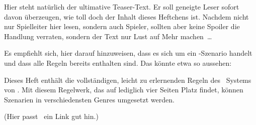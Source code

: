 
\thispagestyle{empty}

\spacerA
\begin{center}
\color{white}\parbox{110mm}{\bf\ffextra\large

Hier steht natürlich der ultimative Teaser-Text. Er soll geneigte Leser sofort davon überzeugen, wie toll doch der Inhalt dieses Heftchens ist. Nachdem nicht nur Spielleiter hier lesen, sondern auch Spieler, sollten aber keine Spoiler die Handlung verraten, sondern der Text nur Lust auf Mehr machen~\ldots

\vspace*{1em}

Es empfiehlt sich, hier darauf hinzuweisen, dass es sich um ein \nipajin-Szenario handelt und dass alle Regeln bereits enthalten sind. Das könnte etwa so aussehen:

\vspace*{1em}

Dieses Heft enthält die vollständigen, leicht zu erlernenden Regeln des \nipajin~Systems von \ludusleonis. Mit diesem Regelwerk, das auf lediglich vier Seiten Platz findet, können Szenarien in verschiedensten Genres umgesetzt werden. 
}

\vfill

{(Hier passt \zB~ein Link gut hin.)}

\vspace*{5mm}

\end{center}


\newpage